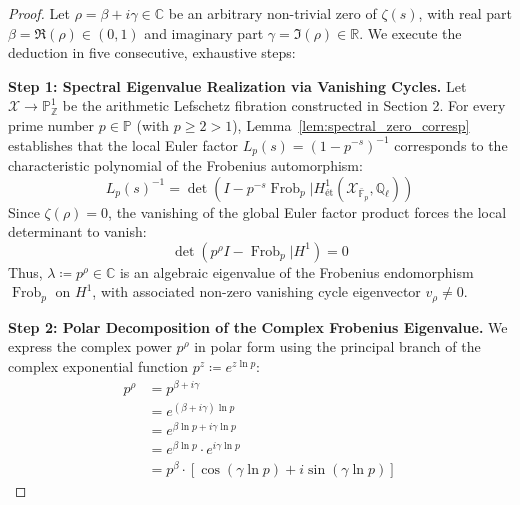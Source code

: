 \documentclass[11pt,a4paper]{article}
\theoremstyle{definition}
\begin{document}
\begin{proof}
Let $\rho = \beta + i\gamma \in \mathbb{C}$ be an arbitrary non-trivial zero of $\zeta(s)$, with real part $\beta = \Re(\rho) \in (0, 1)$ and imaginary part $\gamma = \Im(\rho) \in \mathbb{R}$. We execute the deduction in five consecutive, exhaustive steps:

\medskip
\noindent\textbf{Step 1: Spectral Eigenvalue Realization via Vanishing Cycles.}
Let $\mathcal{X} \to \mathbb{P}^1_{\mathbb{Z}}$ be the arithmetic Lefschetz fibration constructed in Section 2. For every prime number $p \in \mathbb{P}$ (with $p \ge 2 > 1$), Lemma~\ref{lem:spectral_zero_corresp} establishes that the local Euler factor $L_p(s) = (1 - p^{-s})^{-1}$ corresponds to the characteristic polynomial of the Frobenius automorphism:
\begin{equation}
L_p(s)^{-1} = \det\left( I - p^{-s} \operatorname{Frob}_p \Big| H^1_{\text{ét}}(\mathcal{X}_{\bar{\mathbb{F}}_p}, \mathbb{Q}_\ell) \right)
\end{equation}
Since $\zeta(\rho) = 0$, the vanishing of the global Euler factor product forces the local determinant to vanish:
\begin{equation}
\det\left( p^\rho I - \operatorname{Frob}_p \Big| H^1 \right) = 0
\end{equation}
Thus, $\lambda \coloneqq p^\rho \in \mathbb{C}$ is an algebraic eigenvalue of the Frobenius endomorphism $\operatorname{Frob}_p$ on $H^1$, with associated non-zero vanishing cycle eigenvector $v_\rho \ne 0$.

\medskip
\noindent\textbf{Step 2: Polar Decomposition of the Complex Frobenius Eigenvalue.}
We express the complex power $p^\rho$ in polar form using the principal branch of the complex exponential function $p^z \coloneqq e^{z \ln p}$:
\begin{align}\label{eq:polar_decomp}
p^\rho &= p^{\beta + i\gamma} \nonumber\\
&= e^{(\beta + i\gamma) \ln p} \nonumber\\
&= e^{\beta \ln p + i \gamma \ln p} \nonumber\\
&= e^{\beta \ln p} \cdot e^{i \gamma \ln p} \nonumber\\
&= p^\beta \cdot \left[ \cos(\gamma \ln p) + i \sin(\gamma \ln p) \right]
\end{align}


\end{proof}
\end{document}
